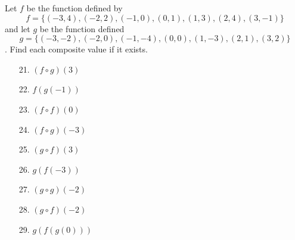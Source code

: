 \documentclass[12pt]{article}
\theoremstyle{definition}
\begin{document}
Let $f$ be the function defined by \[f = \{(-3, 4), (-2, 2), (-1, 0), (0, 1), (1, 3), (2, 4), (3, -1)\}\] and let $g$ be the function defined \[g = \{(-3, -2), (-2, 0), (-1, -4), (0, 0), (1, -3), (2, 1), (3, 2)\}\].  Find each composite value if it exists.

\begin{multicols}{3}
\begin{enumerate}
\item[21.] $(f \circ g)(3)$\\
\item[22.] $f(g(-1))$\\
\item[23.] $(f \circ f)(0)$\\
\item[24.] $(f \circ g)(-3)$\\
\item[25.] $(g \circ f)(3)$\\
\item[26.] $g(f(-3))$\\
\item[27.] $(g \circ g)(-2)$\\
\item[28.] $(g \circ f)(-2)$\\
\item[29.] $g(f(g(0)))$\\
\end{enumerate}
\end{multicols}
\newpage
\end{document}

